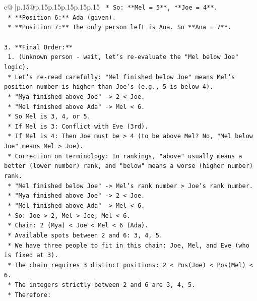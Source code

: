 \documentclass{article}
\begin{document}
{\begin{supertabular}{c@{$\;$}|p{.15\linewidth}@{}p{.15\linewidth}p{.15\linewidth}p{.15\linewidth}p{.15\linewidth}p{.15\linewidth}}
{{{\texttt{        *   So: **Mel = 5**, **Joe = 4**.} \\
\texttt{    *   **Position 6:** Ada (given).} \\
\texttt{    *   **Position 7:** The only person left is Ana. So **Ana = 7**.} \\
\\ 
\texttt{3.  **Final Order:**} \\
\texttt{    1.  (Unknown person {-} wait, let's re{-}evaluate the "Mel below Joe" logic).} \\
\texttt{        *   Let's re{-}read carefully: "Mel finished below Joe" means Mel's position number is higher than Joe's (e.g., 5 is below 4).} \\
\texttt{        *   "Mya finished above Joe" {-}> 2 < Joe.} \\
\texttt{        *   "Mel finished above Ada" {-}> Mel < 6.} \\
\texttt{        *   So Mel is 3, 4, or 5.} \\
\texttt{        *   If Mel is 3: Conflict with Eve (3rd).} \\
\texttt{        *   If Mel is 4: Then Joe must be > 4 (to be above Mel? No, "Mel below Joe" means Mel > Joe).} \\
\texttt{            *   Correction on terminology: In rankings, "above" usually means a better (lower number) rank, and "below" means a worse (higher number) rank.} \\
\texttt{            *   "Mel finished below Joe" {-}> Mel's rank number > Joe's rank number.} \\
\texttt{            *   "Mya finished above Joe" {-}> 2 < Joe.} \\
\texttt{            *   "Mel finished above Ada" {-}> Mel < 6.} \\
\texttt{            *   So: Joe > 2, Mel > Joe, Mel < 6.} \\
\texttt{            *   Chain: 2 (Mya) < Joe < Mel < 6 (Ada).} \\
\texttt{            *   Available spots between 2 and 6: 3, 4, 5.} \\
\texttt{            *   We have three people to fit in this chain: Joe, Mel, and Eve (who is fixed at 3).} \\
\texttt{            *   The chain requires 3 distinct positions: 2 < Pos(Joe) < Pos(Mel) < 6.} \\
\texttt{            *   The integers strictly between 2 and 6 are 3, 4, 5.} \\
\texttt{            *   Therefore:} \\
}}}
\end{supertabular}}
\end{document}
